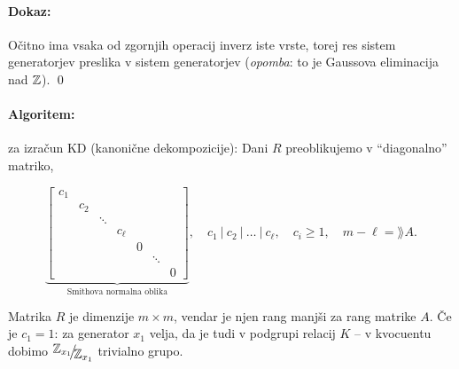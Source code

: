 \paragraph{Dokaz:}
O\v citno ima vsaka od zgornjih operacij inverz iste vrste, torej res sistem generatorjev preslika v sistem generatorjev
({\em opomba}: to je Gaussova eliminacija nad $\mathbb{Z}$). \qed

\paragraph{Algoritem:}
za izra\v cun KD (kanoni\v cne dekompozicije): Dani $R$ preoblikujemo v "`diagonalno"' matriko,

\[
	\underbrace{\begin{bmatrix}
		c_1 &     &        &        &   &        &   \\
		    & c_2 &        &        &   &        &   \\
		    &     & \ddots &        &   &        &   \\
		    &     &        & c_\ell &   &        &   \\
		    &     &        &        & 0 &        &   \\
		    &     &        &        &   & \ddots &   \\
		    &     &        &        &   &        & 0
	\end{bmatrix}}_{\text{Smithova normalna oblika}}, \quad c_1\ |\ c_2\ |\ \ldots\ |\ c_\ell,\quad c_i \geq 1,
		\quad m - \ell = \rang A.
\]

\ni Matrika $R$ je dimenzije $m \times m$, vendar je njen rang manj\v si za rang matrike $A$. \v Ce je $c_1 = 1$: za generator $x_1$
velja, da je tudi v podgrupi relacij $K$ -- v kvocuentu dobimo $\quot{\Z_{x_1}}{\Z_{x_1}}$ trivialno grupo.

